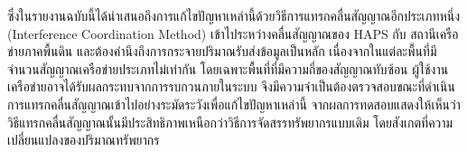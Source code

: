 ซึ่งในรายงานฉบับนี้ได้นำเสนอถึงการแก้ไขปัญหาเหล่านี้ด้วยวิธีการแทรกคลื่นสัญญาณอีกประเภทหนึ่ง
(Interference Coordination Method) เข้าไประหว่างคลื่นสัญญาณของ HAPS กับ สถานีเครือข่ายภาคพื้นดิน
และต้องคำนึงถึงการกระจายปริมาณรับส่งข้อมูลเป็นหลัก เนื่องจากในแต่ละพื้นที่มีจำนวนสัญญาณเครือข่ายประเภทไม่เท่ากัน โดยเฉพาะพื้นที่ที่มีความถี่ของสัญญาณทับซ้อน
ผู้ใช้งานเครือข่ายอาจได้รับผลกระทบจากการรบกวนภายในระบบ จึงมีความจำเป็นต้องตรวจสอบขณะที่ดำเนินการแทรกคลื่นสัญญาณเข้าไปอย่างระมัดระวังเพื่อแก้ไขปัญหาเหล่านี้
จากผลการทดสอบแสดงให้เห็นว่าวิธีแทรกคลื่นสัญญาณนั้นมีประสิทธิภาพเหนือกว่าวิธีการจัดสรรทรัพยากรแบบเดิม โดยสังเกตที่ความเปลี่ยนแปลงของปริมาณทรัพยากร